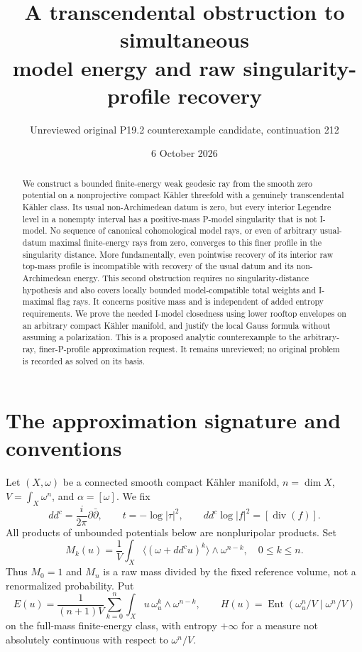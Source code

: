 \documentclass[11pt]{article}
\title{A transcendental obstruction to simultaneous\protect\\ model energy and raw singularity-profile recovery}
\author{Unreviewed original P19.2 counterexample candidate, continuation 212}
\date{6 October 2026}
\newcommand{\ddc}{dd^c}
\begin{document}
\maketitle
\begin{abstract}
We construct a bounded finite-energy weak geodesic ray from the smooth
zero potential on a nonprojective compact K\"ahler threefold with a
genuinely transcendental K\"ahler class. Its usual non-Archimedean datum
is zero, but every interior Legendre level in a nonempty interval has a
positive-mass P-model singularity that is not I-model. No sequence of
canonical cohomological model rays, or even of arbitrary usual-datum
maximal finite-energy rays from zero, converges to this finer profile
in the singularity distance. More fundamentally, even pointwise recovery
of its interior raw top-mass profile is incompatible with recovery of
the usual datum and its non-Archimedean energy. This second obstruction
requires no singularity-distance hypothesis and also covers locally
bounded model-compatible total weights and I-maximal flag rays. It
concerns positive mass and is independent of added entropy requirements. We prove the
needed I-model closedness using lower rooftop envelopes on an arbitrary
compact K\"ahler manifold, and justify the local Gauss formula without
assuming a polarization. This is a proposed analytic counterexample to
the arbitrary-ray, finer-P-profile approximation request. It remains
unreviewed; no original problem is recorded as solved on its basis.
\end{abstract}

\section{The approximation signature and conventions}
Let $(X,\omega)$ be a connected smooth compact K\"ahler manifold,
$n=\dim X$, $V=\int_X\omega^n$, and $\alpha=[\omega]$. We fix
\[
 \ddc=\frac{i}{2\pi}\partial\bar\partial,
 \qquad t=-\log|\tau|^2,
 \qquad \ddc\log|f|^2=[\operatorname{div}(f)].                 \tag{1}
\]
All products of unbounded potentials below are nonpluripolar products.
Set
\[
 M_k(u)=\frac1V\int_X\langle(\omega+\ddc u)^k\rangle
                      \wedge\omega^{n-k},\quad 0\le k\le n.
                                                               \tag{2}
\]
Thus $M_0=1$ and $M_n$ is a raw mass divided by the fixed reference
volume, not a renormalized probability. Put
\[
 E(u)=\frac1{(n+1)V}\sum_{k=0}^n
     \int_X u\,\omega_u^k\wedge\omega^{n-k},\qquad
 H(u)=\operatorname{Ent}(\omega_u^n/V\mid\omega^n/V)
                                                               \tag{3}
\]
on the full-mass finite-energy class, with entropy $+\infty$ for a
measure not absolutely continuous with respect to $\omega^n/V$.
\end{document}
